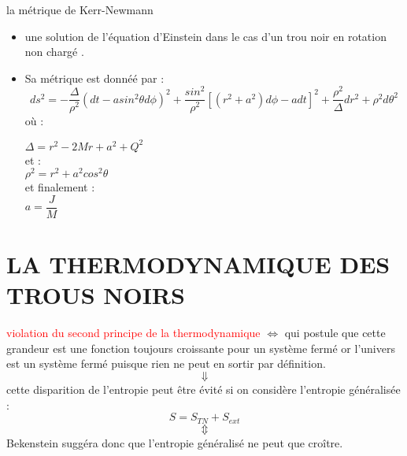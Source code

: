 \documentclass{beamer}
\begin{document}
\begin{frame}
\begin{block}{la métrique de Kerr-Newmann}
	
	
	\begin{itemize}
		\item  une solution de l'équation d'Einstein dans le cas d'un trou noir en rotation non chargé .
		
		\item Sa métrique est donnéé par :
		$$ds^{2}=-\dfrac{\Delta}{\rho^{2}}(dt-asin^{2}\theta d\phi)^{2}+\dfrac{sin^{2}}{\rho^{2}}[(r^{2}+a^{2})d\phi-adt]^{2}+\dfrac{\rho^{2}}{\Delta}dr^{2}+\rho^{2}d\theta^{2}$$
		où :
		
		$\Delta=r^{2}-2Mr+a^{2}+Q^{2}$\\
		et :\\
		$\rho^{2}=r^{2}+a^{2}cos^{2}\theta$ \\
		et finalement :\\
		$a=\dfrac{J}{M}$
	
		
	\end{itemize}
	
\end{block}
\end{frame}
\section{ LA THERMODYNAMIQUE DES TROUS	NOIRS}
\begin{frame}
 \textcolor{red}{violation du second principe de la thermodynamique} $\Leftrightarrow$ qui postule que cette grandeur est une fonction toujours croissante pour un système fermé or l'univers est un système fermé puisque rien ne peut en sortir par définition.$$\Downarrow$$ 
 cette disparition de l'entropie peut être évité si on considère l'entropie généralisée :
 $$S=S_{TN}+S_{ext}$$
 $$\Updownarrow$$ Bekenstein suggéra
 donc que l'entropie généralisé ne peut que croître.
 
\end{frame}
\end{document}
